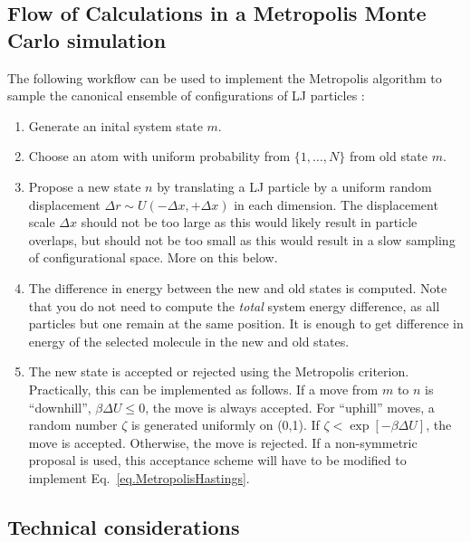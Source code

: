 \documentclass[aip,jcp,preprint,superscriptaddress,floatfix]{revtex4-1}
\begin{document}
\subsection{Flow of Calculations in a Metropolis Monte Carlo simulation}
\label{sec.flow}

The following workflow can be used to implement the Metropolis algorithm to sample the canonical ensemble of configurations of LJ particles \cite{Shell.Notes, Maginn.Notes}:

\begin{enumerate}
\setlength{\itemsep}{0em} %
\item Generate an inital system state $m$.
\item Choose an atom with uniform probability from $\{1, \ldots, N\}$ from old state $m$.
\item Propose a new state $n$ by translating a LJ particle by a uniform random displacement $\Delta r \sim U(-\Delta x, +\Delta x)$ in each dimension.
	The displacement scale $\Delta x$ should not be too large as this would
	likely result in particle overlaps, but should not be too small
	as this would result in a slow sampling of configurational space.
	More on this below.
\item The difference in energy between the new and old states is computed.
	Note that you do not need to compute the \textit{total} system energy
	difference, as all particles but one remain at the same position. 
	It is enough to get difference in energy of the selected molecule 
	in the new and old states.
\item The new state is accepted or rejected using the Metropolis criterion.
	Practically, this can be implemented as follows. 
	If a move from $m$ to $n$ is ``downhill'', $\beta \Delta U \leq 0$,
	the move is always accepted. For ``uphill'' moves, a random
	number $\zeta$ is generated uniformly on (0,1).  
	If $\zeta < \exp[-\beta {\Delta U}]$, the move is
	accepted.  Otherwise, the move is rejected. 
	If a non-symmetric proposal is used, this acceptance scheme will have to be modified to implement Eq.~\ref{eq.MetropolisHastings}.
\end{enumerate}

\subsection{Technical considerations}
\end{document}
